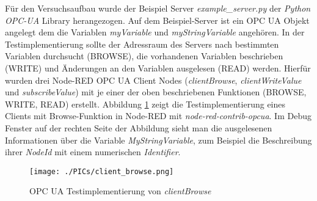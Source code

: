 \documentclass[BMR,Bachelor,ngerman]{twbook}%
\begin{document}
Für den Versuchsaufbau wurde der Beispiel Server \emph{example\_server.py} der \emph{Python OPC-UA} Library herangezogen. Auf dem Beispiel-Server ist ein \ac{OPC UA} Objekt angelegt dem die Variablen \emph{myVariable} und \emph{myStringVariable} angehören. In der Testimplementierung sollte der Adressraum des Servers nach bestimmten Variablen durchsucht (BROWSE), die vorhandenen Variablen beschrieben (WRITE) und Änderungen an den Variablen ausgelesen (READ) werden. Hierfür wurden drei Node-RED \ac{OPC UA} Client Nodes (\emph{clientBrowse}, \emph{clientWriteValue} und \emph{subscribeValue}) mit je einer der oben beschriebenen Funktionen (BROWSE, WRITE, READ) erstellt. Abbildung \ref{fig:client_browse} zeigt die Testimplementierung eines Clients mit Browse-Funktion in Node-RED mit \emph{node-red-contrib-opcua}. Im Debug Fenster auf der rechten Seite der Abbildung sieht man die ausgelesenen Informationen über die Variable \emph{MyStringVariable}, zum Beispiel die Beschreibung ihrer \emph{NodeId} mit einem numerischen \emph{Identifier}.  %
%
\begin{figure}[H]
\centering
\texttt{[image: ./PICs/client\_browse.png]}
\caption{\ac{OPC UA} Testimplementierung von \emph{clientBrowse}}\label{fig:client_browse}
\end{figure}
\end{document}
